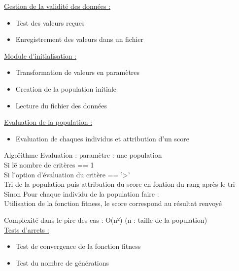 \documentclass[a4paper,11pt]{article}
\begin{document}
		\underline{Gestion de la validité des données : }
		\begin{itemize}
			\item Test des valeurs reçues
			\item Enregistrement des valeurs dans un fichier\\
		\end{itemize}
		
		\underline{Module d'initialisation : }
		\begin{itemize}
			\item Transformation de valeurs en paramètres
			\item Creation de la population initiale
			\item Lecture du fichier des données\\
		\end{itemize}
	
		\underline{Evaluation de la population : }
		\begin{itemize}
			\item Evaluation de chaques individus et attribution d'un score
		\end{itemize}
		\begin{tabbing} 
		Algo\=rithme Evaluation : paramètre : une population\\
			\>Si l\=e nombre de critères == 1\\
			\>	\>Si l\='option d'évaluation du critère == '>'\\
			\>	\>	\>Tri de la population puis attribution du score en fontion du rang après le tri\\
			\>Sinon
			\>	\>Pour chaque individu de la population faire :\\
			\>	\>	\>Utilisation de la fonction fitness, le score correspond au résultat renvoyé
		\end{tabbing}
		Complexité dans le pire des cas : O(n²) (n : taille de la population)\\
		
		\underline{Tests d'arrets : }
		\begin{itemize}
			\item Test de convergence de la fonction fitness
			\item Test du nombre de générations\\
		\end{itemize}
\end{document}
